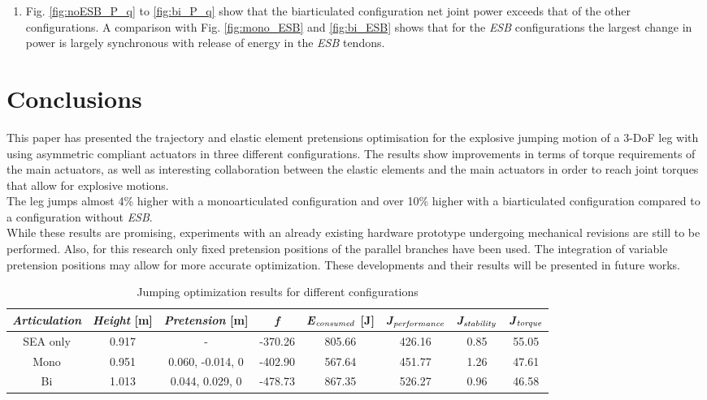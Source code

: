 \documentclass[letterpaper, 10 pt, conference]{ieeeconf}  %
\begin{document}
\begin{enumerate}
\item Fig. \ref{fig:noESB_P_q} to \ref{fig:bi_P_q} show that the biarticulated configuration net joint power exceeds that of the other configurations. A comparison with Fig. \ref{fig:mono_ESB} and \ref{fig:bi_ESB} shows that for the \textit{ESB} configurations the largest change in power is largely synchronous with release of energy in the \textit{ESB} tendons.
\end{enumerate}

\section{Conclusions} \label{sec:conclusions} 

This paper has presented the trajectory and elastic element pretensions optimisation for the explosive jumping motion of a 3-DoF leg with using asymmetric compliant actuators in three different configurations. The results show improvements in terms of torque requirements of the main actuators, as well as interesting collaboration between the elastic elements and the main actuators in order to reach joint torques that allow for explosive motions.\\
The leg jumps almost 4\% higher with a monoarticulated configuration and over 10\% higher with a biarticulated configuration compared to a configuration without \textit{ESB}.\\
While these results are promising, experiments with an already existing hardware prototype undergoing mechanical revisions are still to be performed. Also, for this research only fixed pretension positions of the parallel branches have been used. The integration of variable pretension positions may allow for more accurate optimization. These developments and their results will be presented in future works.

\begin{table}[ht]
	\caption{Jumping optimization results for different configurations}
	\label{maxheight}
	\begin{center}
		\begin{tabular}[t]{c||c|c|c|c|c|c|c}
			\textit{Articulation}	& \textit{Height} [m] & \textit{Pretension} [m] & \textit{f} & \textit{E}$_{\text{\textit{consumed}}}$ [J] & \textit{J}$_{\text{\textit{performance}}}$ & \textit{J}$_{\text{\textit{stability}}}$ & \textit{J}$_{\text{\textit{torque}}}$\\ 
			\hline
			SEA only& 0.917 & - &-370.26  & 805.66 & 426.16  &0.85  &   55.05\\
			\hline
			Mono &0.951 & 0.060, -0.014, 0  & -402.90 & 567.64& 451.77 & 1.26 &47.61 \\
			\hline
			Bi &1.013 & 0.044, 0.029, 0 & -478.73 & 867.35 & 526.27 & 0.96 & 46.58
		\end{tabular}
	\end{center}
\end{table}
\end{document}
